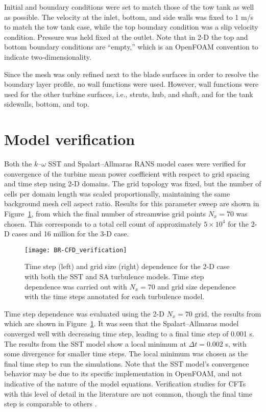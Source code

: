 Initial and boundary conditions were set to match those of the tow tank as well
as possible. The velocity at the inlet, bottom, and side walls was fixed to 1
m/s to match the tow tank case, while the top boundary condition was a slip
velocity condition. Pressure was held fixed at the outlet. Note that in 2-D the
top and bottom boundary conditions are ``empty,'' which is an OpenFOAM
convention to indicate two-dimensionality.

Since the mesh was only refined next to the blade surfaces in order to resolve
the boundary layer profile, no wall functions were used. However, wall functions
were used for the other turbine surfaces, i.e., struts, hub, and shaft, and for
the tank sidewalls, bottom, and top.


\section{Model verification}

Both the $k$--$\omega$ SST and Spalart--Allmaras RANS model cases were verified
for convergence of the turbine mean power coefficient with respect to grid
spacing and time step using 2-D domains. The grid topology was fixed, but the
number of cells per domain length was scaled proportionally, maintaining the
same background mesh cell aspect ratio. Results for this parameter sweep are
shown in Figure~\ref{fig:2d-br-verification}, from which the final number of
streamwise grid points $N_x = 70$ was chosen. This corresponds to a total cell
count of approximately $5 \times 10^4$ for the 2-D cases and 16 million for the
3-D case.

\begin{figure}
    \centering

    \texttt{[image: BR-CFD\_verification]}

    \caption{Time step (left) and grid size (right) dependence for the 2-D case
        with both the SST and SA turbulence models. Time step dependence was carried
        out with $N_x=70$ and grid size dependence with the time steps annotated for
        each turbulence model.}

    \label{fig:2d-br-verification}
\end{figure}

Time step dependence was evaluated using the 2-D $N_x=70$ grid, the results from
which are shown in Figure~\ref{fig:2d-br-verification}. It was seen that the
Spalart--Allmaras model converged well with decreasing time step, leading to a
final time step of 0.001 s. The results from the SST model show a local minimum
at $\Delta t = 0.002$ s, with some divergence for smaller time steps. The local
minimum was chosen as the final time step to run the simulations. Note that the
SST model's convergence behavior may be due to its specific implementation in
OpenFOAM, and not indicative of the nature of the model equations. Verification
studies for CFTs with this level of detail in the literature are not common,
though the final time step is comparable to others \cite{Balduzzi2016}.


